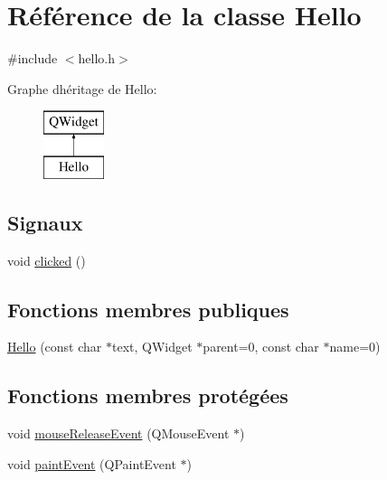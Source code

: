 \hypertarget{class_hello}{}\section{Référence de la classe Hello}
\label{class_hello}


{\ttfamily \#include $<$hello.\+h$>$}

Graphe d\textquotesingle{}héritage de Hello\+:\begin{figure}[H]
\begin{center}
\leavevmode
\includegraphics[height=2.000000cm]{class_hello}
\end{center}
\end{figure}
\subsection*{Signaux}
\begin{DoxyCompactItemize}
\item 
void \hyperlink{class_hello_aaa91c4c2ffcd4162a66eca03a0159ac5}{clicked} ()
\end{DoxyCompactItemize}
\subsection*{Fonctions membres publiques}
\begin{DoxyCompactItemize}
\item 
\hyperlink{class_hello_a1bc8a70a420e10fdb4ecbfe333385174}{Hello} (const char $\ast$text, Q\+Widget $\ast$parent=0, const char $\ast$name=0)
\end{DoxyCompactItemize}
\subsection*{Fonctions membres protégées}
\begin{DoxyCompactItemize}
\item 
void \hyperlink{class_hello_a2e4469d51f09b87bd2a0c3b04f2fab0a}{mouse\+Release\+Event} (Q\+Mouse\+Event $\ast$)
\item 
void \hyperlink{class_hello_aaa8216c0b51615d1dcdfc7a298444545}{paint\+Event} (Q\+Paint\+Event $\ast$)
\end{DoxyCompactItemize}


